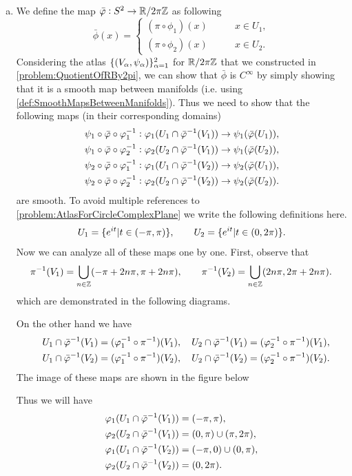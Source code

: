 \begin{solution}
	$ \ $
	\begin{enumerate}[(a)]
		\item We define the map $ \bar{\varphi}:S^2 \to \mathbb{R}/2\pi\mathbb{Z} $ as following
		\[ \bar{\phi}(x) = \begin{cases}
			(\pi\circ\phi_1)(x) \qquad & x \in U_1,\\
			(\pi\circ\phi_2)(x) \qquad & x\in U_2.
		\end{cases} \]
		Considering the atlas $ \{(V_\alpha,\psi_\alpha)\}_{\alpha=1}^{2} $ for $ \mathbb{R}/2\pi\mathbb{Z} $ that we constructed in \autoref{problem:QuotientOfRBy2pi}, we can show that $ \bar{\phi} $ is $ C^\infty $ by simply showing that it is a smooth map between manifolds (i.e. using \autoref{def:SmoothMapsBetweenManifolds}). Thus we need to show that the following maps (in their corresponding domains)
		\begin{align*}
			 \psi_1\circ\bar{\varphi}\circ\varphi_1^{-1}: \varphi_1(U_1\cap \bar{\varphi}^{-1}(V_1))\to \psi_1(\bar{\varphi}(U_1)),\\
			 \psi_1\circ\bar{\varphi}\circ\varphi_2^{-1}: \varphi_2(U_2\cap \bar{\varphi}^{-1}(V_1))\to \psi_1(\bar{\varphi}(U_2)),\\
			 \psi_2\circ\bar{\varphi}\circ\varphi_1^{-1}: \varphi_1(U_1\cap \bar{\varphi}^{-1}(V_2))\to \psi_2(\bar{\varphi}(U_1)),\\
			 \psi_2\circ\bar{\varphi}\circ\varphi_2^{-1}: \varphi_2(U_2\cap \bar{\varphi}^{-1}(V_2))\to \psi_2(\bar{\varphi}(U_2)).
		\end{align*}
		are smooth. To avoid multiple references to \autoref{problem:AtlasForCircleComplexPlane} we write the following definitions here. 
	\[ U_1 = \{e^{it}| t \in (-\pi,\pi)\},\qquad U_2 = \{e^{it}| t \in (0,2\pi)\}. \]
		Now we can analyze all of these maps one by one. First, observe that 
		\[ \pi^{-1}(V_1) = \bigcup_{n\in\mathbb{Z}}(-\pi+2n\pi, \pi+2n\pi), \qquad \pi^{-1}(V_2) = \bigcup_{n\in\mathbb{Z}}(2n\pi, 2\pi+2n\pi). \]
		which are demonstrated in the following diagrams.
		
		On the other hand we have
		\begin{align*}
			&U_1\cap \bar{\varphi}^{-1}(V_1) = (\varphi_1^{-1}\circ\pi^{-1})(V_1),  
			\quad U_2\cap \bar{\varphi}^{-1}(V_1) = (\varphi_2^{-1}\circ\pi^{-1})(V_1),\\
			\quad &U_1\cap \bar{\varphi}^{-1}(V_2) = (\varphi_1^{-1}\circ\pi^{-1})(V_2),
			\quad U_2\cap \bar{\varphi}^{-1}(V_2) = (\varphi_2^{-1}\circ\pi^{-1})(V_2).
		\end{align*}
		The image of these maps are shown in the figure below
		
		\FloatBarrier
		Thus we will have
		\begin{align*}
			&\varphi_1(U_1\cap \bar{\varphi}^{-1}(V_1)) = (-\pi,\pi),\\
			&\varphi_2(U_2\cap \bar{\varphi}^{-1}(V_1)) = (0,\pi)\cup(\pi,2\pi),\\
			&\varphi_1(U_1\cap \bar{\varphi}^{-1}(V_2)) = (-\pi,0) \cup (0,\pi),\\
			&\varphi_2(U_2\cap \bar{\varphi}^{-1}(V_2)) = (0,2\pi).
		\end{align*}
		

\end{enumerate}
\end{solution}
